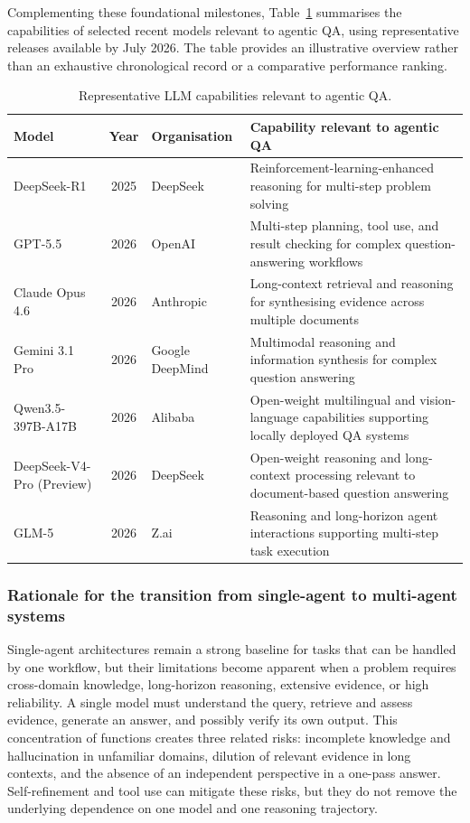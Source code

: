 \documentclass[a4paper,fleqn]{cas-dc}
\begin{document}
Complementing these foundational milestones, Table~\ref{tab:llm_evolution} summarises the capabilities of selected recent models relevant to agentic QA, using representative releases available by July 2026. The table provides an illustrative overview rather than an exhaustive chronological record or a comparative performance ranking.


\begin{table}[pos=t]
  \centering
  \caption{Representative LLM capabilities relevant to agentic QA. }
  \label{tab:llm_evolution}
  \begin{tabular}{l c l p{7cm}}
    \toprule
    \textbf{Model} & \textbf{Year} & \textbf{Organisation} &
    \textbf{Capability relevant to agentic QA} \\
    \midrule
    DeepSeek-R1 & 2025 & DeepSeek &
      Reinforcement-learning-enhanced reasoning for multi-step problem solving \\
    GPT-5.5 & 2026 & OpenAI &
      Multi-step planning, tool use, and result checking for complex question-answering workflows \\
    Claude Opus 4.6 & 2026 & Anthropic &
      Long-context retrieval and reasoning for synthesising evidence across multiple documents \\
    Gemini 3.1 Pro & 2026 & Google DeepMind &
      Multimodal reasoning and information synthesis for complex question answering \\
    Qwen3.5-397B-A17B & 2026 & Alibaba &
      Open-weight multilingual and vision-language capabilities supporting locally deployed QA systems \\
    DeepSeek-V4-Pro (Preview) & 2026 & DeepSeek &
      Open-weight reasoning and long-context processing relevant to document-based question answering \\
    GLM-5 & 2026 & Z.ai &
      Reasoning and long-horizon agent interactions supporting multi-step task execution \\
    \bottomrule
  \end{tabular}
\end{table}

\subsubsection{Rationale for the transition from single-agent to multi-agent systems}
\label{sec:motivation}

Single-agent architectures remain a strong baseline for tasks that can be
handled by one workflow, but their limitations become apparent when a problem
requires cross-domain knowledge, long-horizon reasoning, extensive evidence,
or high reliability. A single model must understand the query, retrieve and
assess evidence, generate an answer, and possibly verify its own output. This
concentration of functions creates three related risks: incomplete knowledge
and hallucination in unfamiliar domains, dilution of relevant evidence in long
contexts, and the absence of an independent perspective in a one-pass answer.
Self-refinement and tool use can mitigate these risks, but they do not remove
the underlying dependence on one model and one reasoning trajectory.
\end{document}
